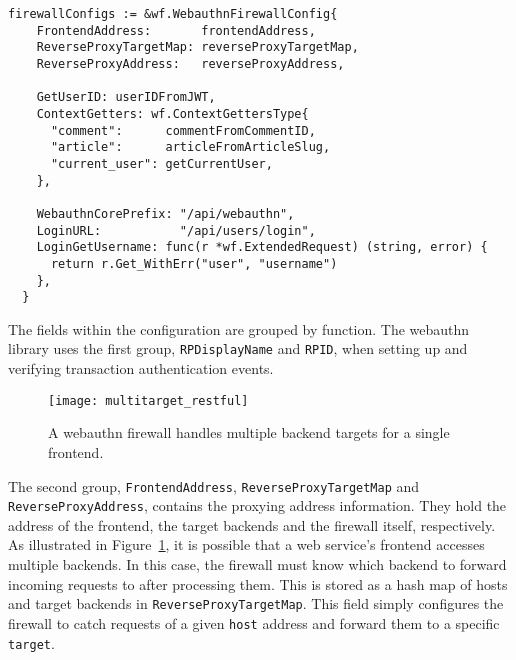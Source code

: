 \begin{lstlisting}[float=h]
  firewallConfigs := &wf.WebauthnFirewallConfig{
    FrontendAddress:       frontendAddress,
    ReverseProxyTargetMap: reverseProxyTargetMap,
    ReverseProxyAddress:   reverseProxyAddress,

    GetUserID: userIDFromJWT,
    ContextGetters: wf.ContextGettersType{
      "comment":      commentFromCommentID,
      "article":      articleFromArticleSlug,
      "current_user": getCurrentUser,
    },

    WebauthnCorePrefix: "/api/webauthn",
    LoginURL:           "/api/users/login",
    LoginGetUsername: func(r *wf.ExtendedRequest) (string, error) {
      return r.Get_WithErr("user", "username")
    },
  }
\end{lstlisting}

The fields within the configuration are grouped by function. The webauthn library uses the first group, \lstinline{RPDisplayName} and \lstinline{RPID}, when setting up and verifying transaction authentication events. 

\begin{figure}[h]
  \centering
  \texttt{[image: multitarget\_restful]}
  \caption{A webauthn firewall handles multiple backend targets for a single frontend.}\label{Fig:MultiTargetRESTful}
\end{figure}

The second group, \lstinline{FrontendAddress}, \lstinline{ReverseProxyTargetMap} and \lstinline{ReverseProxyAddress}, contains the proxying address information. They hold the address of the frontend, the target backends and the firewall itself, respectively. As illustrated in Figure~\ref{Fig:MultiTargetRESTful}, it is possible that a web service's frontend accesses multiple backends. In this case, the firewall must know which backend to forward incoming requests to after processing them. This is stored as a hash map of hosts and target backends in \lstinline{ReverseProxyTargetMap}. This field simply configures the firewall to catch requests of a given \lstinline{host} address and forward them to a specific \lstinline{target}.


